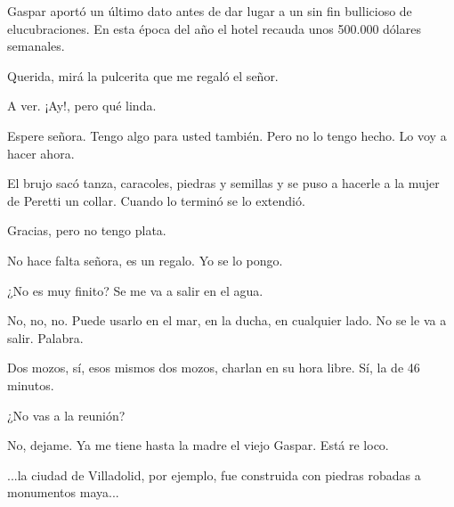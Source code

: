 \documentclass[12pt,twoside,openright,a5paper]{book}
\begin{document}
Gaspar aportó un último dato antes de dar lugar a un sin fin bullicioso
de elucubraciones. En esta época del año el hotel recauda unos 500.000
dólares semanales.

\vspace{0.5cm}

\hrulefill\hspace{0.2cm} \decofourleft\decofourright \hspace{0.2cm} \hrulefill
\vspace{0.5cm}

Querida, mirá la pulcerita que me regaló el señor.

A ver. ¡Ay!, pero qué linda.

Espere señora. Tengo algo para usted también. Pero no lo tengo hecho. Lo
voy a hacer ahora.

El brujo sacó tanza, caracoles, piedras y semillas y se puso a hacerle a
la mujer de Peretti un collar. Cuando lo terminó se lo extendió.

Gracias, pero no tengo plata.

No hace falta señora, es un regalo. Yo se lo pongo.

¿No es muy finito? Se me va a salir en el agua.

No, no, no. Puede usarlo en el mar, en la ducha, en cualquier lado. No se
le va a salir. Palabra.

\vspace{0.5cm}

\hrulefill\hspace{0.2cm} \decofourleft\decofourright \hspace{0.2cm} \hrulefill
\vspace{0.5cm}

Dos mozos, sí, esos mismos dos mozos, charlan en su hora libre. Sí, la de
46 minutos.

¿No vas a la reunión?

No, dejame. Ya me tiene hasta la madre el viejo Gaspar. Está re loco.

\vspace{0.5cm}

\hrulefill\hspace{0.2cm} \decofourleft\decofourright \hspace{0.2cm} \hrulefill
\vspace{0.5cm}

...la ciudad de Villadolid, por ejemplo,
fue construida con piedras robadas a monumentos maya...


\vspace{0.5cm}
\afterpage{}
\hrulefill\hspace{0.2cm} \decofourleft\decofourright \hspace{0.2cm} \hrulefill
\vspace{0.5cm}
\end{document}
